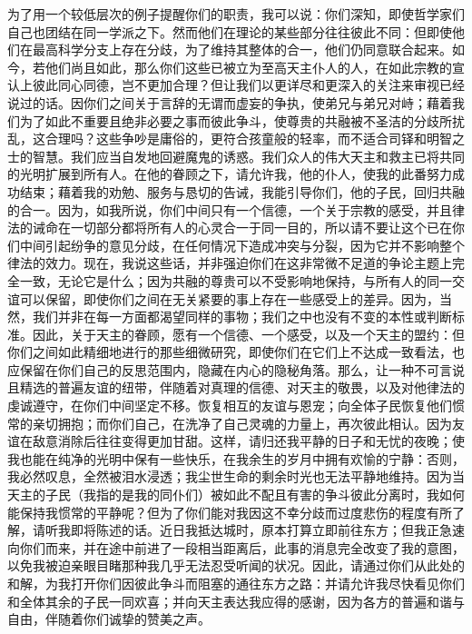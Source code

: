 为了用一个较低层次的例子提醒你们的职责，我可以说：你们深知，即使哲学家们自己也团结在同一学派之下。然而他们在理论的某些部分往往彼此不同：但即使他们在最高科学分支上存在分歧，为了维持其整体的合一，他们仍同意联合起来。如今，若他们尚且如此，那么你们这些已被立为至高天主仆人的人，在如此宗教的宣认上彼此同心同德，岂不更加合理？但让我们以更详尽和更深入的关注来审视已经说过的话。因你们之间关于言辞的无谓而虚妄的争执，使弟兄与弟兄对峙；藉着我们为了如此不重要且绝非必要之事而彼此争斗，使尊贵的共融被不圣洁的分歧所扰乱，这合理吗？这些争吵是庸俗的，更符合孩童般的轻率，而不适合司铎和明智之士的智慧。我们应当自发地回避魔鬼的诱惑。我们众人的伟大天主和救主已将共同的光明扩展到所有人。在他的眷顾之下，请允许我，他的仆人，使我的此番努力成功结束；藉着我的劝勉、服务与恳切的告诫，我能引导你们，他的子民，回归共融的合一。因为，如我所说，你们中间只有一个信德，一个关于宗教的感受，并且律法的诫命在一切部分都将所有人的心灵合一于同一目的，所以请不要让这个已在你们中间引起纷争的意见分歧，在任何情况下造成冲突与分裂，因为它并不影响整个律法的效力。现在，我说这些话，并非强迫你们在这非常微不足道的争论主题上完全一致，无论它是什么；因为共融的尊贵可以不受影响地保持，与所有人的同一交谊可以保留，即使你们之间在无关紧要的事上存在一些感受上的差异。因为，当然，我们并非在每一方面都渴望同样的事物；我们之中也没有不变的本性或判断标准。因此，关于天主的眷顾，愿有一个信德、一个感受，以及一个天主的盟约：但你们之间如此精细地进行的那些细微研究，即使你们在它们上不达成一致看法，也应保留在你们自己的反思范围内，隐藏在内心的隐秘角落。那么，让一种不可言说且精选的普遍友谊的纽带，伴随着对真理的信德、对天主的敬畏，以及对他律法的虔诚遵守，在你们中间坚定不移。恢复相互的友谊与恩宠；向全体子民恢复他们惯常的亲切拥抱；而你们自己，在洗净了自己灵魂的力量上，再次彼此相认。因为友谊在敌意消除后往往变得更加甘甜。这样，请归还我平静的日子和无忧的夜晚；使我也能在纯净的光明中保有一些快乐，在我余生的岁月中拥有欢愉的宁静：否则，我必然叹息，全然被泪水浸透；我尘世生命的剩余时光也无法平静地维持。因为当天主的子民（我指的是我的同仆们）被如此不配且有害的争斗彼此分离时，我如何能保持我惯常的平静呢？但为了你们能对我因这不幸分歧而过度悲伤的程度有所了解，请听我即将陈述的话。近日我抵达城时，原本打算立即前往东方；但我正急速向你们而来，并在途中前进了一段相当距离后，此事的消息完全改变了我的意图，以免我被迫亲眼目睹那种我几乎无法忍受听闻的状况。因此，请通过你们从此处的和解，为我打开你们因彼此争斗而阻塞的通往东方之路：并请允许我尽快看见你们和全体其余的子民一同欢喜；并向天主表达我应得的感谢，因为各方的普遍和谐与自由，伴随着你们诚挚的赞美之声。\par



